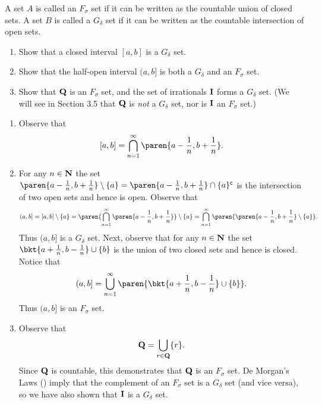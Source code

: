 \documentclass{lew98_solutions}
\begin{document}
\begin{exercise}
\label{ex:3.2.15}
    A set \( A \) is called an \( F_{\sigma} \) set if it can be written as the countable union of closed sets. A set \( B \) is called a \( G_{\delta} \) set if it can be written as the countable intersection of open sets.
    \begin{enumerate}
        \item Show that a closed interval \( [a, b] \) is a \( G_{\delta} \) set.

        \item Show that the half-open interval \( (a, b] \) is both a \( G_{\delta} \) and an \( F_{\sigma} \) set.

        \item Show that \( \mathbf{Q} \) is an \( F_{\sigma} \) set, and the set of irrationals \( \mathbf{I} \) forms a \( G_{\delta} \) set. (We will see in Section 3.5 that \( \mathbf{Q} \) is \textit{not} a \( G_{\delta} \) set, nor is \( \mathbf{I} \) an \( F_{\sigma} \) set.)
    \end{enumerate}
\end{exercise}

\begin{solution}
    \begin{enumerate}
        \item Observe that
        \[
            [a, b] = \bigcap_{n=1}^{\infty} \paren{ a - \frac{1}{n}, b + \frac{1}{n} }.
        \]

        \item For any \( n \in \mathbf{N} \) the set \( \paren{ a - \tfrac{1}{n}, b + \tfrac{1}{n} } \setminus \{ a \} = \paren{ a - \tfrac{1}{n}, b + \tfrac{1}{n} } \cap \setcomp{\{ a \}} \) is the intersection of two open sets and hence is open. Observe that
        \[
            (a, b] = [a, b] \setminus \{ a \} = \paren{ \bigcap_{n=1}^{\infty} \paren{ a - \frac{1}{n}, b + \frac{1}{n} } } \setminus \{ a \} = \bigcap_{n=1}^{\infty} \paren{ \paren{ a - \frac{1}{n}, b + \frac{1}{n} } \setminus \{ a \} }.
        \]
        Thus \( (a, b] \) is a \( G_{\delta} \) set. Next, observe that for any \( n \in \mathbf{N} \) the set \( \bkt{ a + \tfrac{1}{n}, b - \tfrac{1}{n} } \cup \{ b \} \) is the union of two closed sets and hence is closed. Notice that
        \[
            (a, b] = \bigcup_{n=1}^{\infty} \paren{ \bkt{ a + \frac{1}{n}, b - \frac{1}{n} } \cup \{ b \} }.
        \]
        Thus \( (a, b] \) is an \( F_{\sigma} \) set.

        \item Observe that
        \[
            \mathbf{Q} = \bigcup_{r \in \mathbf{Q}} \{ r \}.
        \]
        Since \( \mathbf{Q} \) is countable, this demonstrates that \( \mathbf{Q} \) is an \( F_{\sigma} \) set. De Morgan's Laws () imply that the complement of an \( F_{\sigma} \) set is a \( G_{\delta} \) set (and vice versa), so we have also shown that \( \mathbf{I} \) is a \( G_{\delta} \) set.
    \end{enumerate}
\end{solution}
\end{document}

